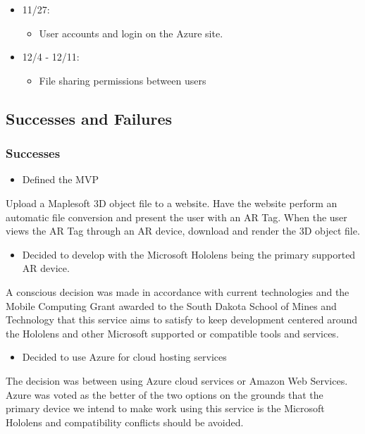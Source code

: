 \begin{itemize}
\begin{itemize}
            \item 11/27:
            \begin{itemize}
                \item User accounts and login on the Azure site.
            \end{itemize}
            
            \item 12/4 - 12/11:
            \begin{itemize}
                \item File sharing permissions between users
            \end{itemize}
        \end{itemize}
    \end{itemize}

\subsection{Successes and Failures}
    \subsubsection{Successes}
        \begin{itemize} \item Defined the MVP \end{itemize}
        \hspace{7mm}
        Upload a Maplesoft 3D object file to a website.  Have the website perform an automatic file conversion and 
        present the user with an AR Tag.  When the user views the AR Tag through an AR device, download and render 
        the 3D object file.

        \begin{itemize} \item Decided to develop with the Microsoft Hololens being the primary supported AR device. \end{itemize}
        \hspace{7mm} 
        A conscious decision was made in accordance with current technologies and the Mobile Computing Grant awarded 
        to the South Dakota School of Mines and Technology that this service aims to satisfy to keep development 
        centered around the Hololens and other Microsoft supported or compatible tools and services.

        \begin{itemize} \item Decided to use Azure for cloud hosting services \end {itemize}
        \hspace{7mm}The decision was between using Azure cloud services or Amazon Web Services.
        Azure was voted as the better of the two options on the grounds that the primary device we intend to make work
        using this service is the Microsoft Hololens and compatibility conflicts should be avoided.

